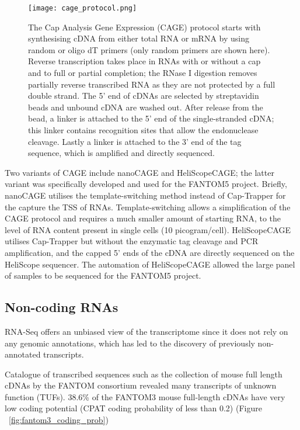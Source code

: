 \begin{figure}[!ht]
   \centering
   \texttt{[image: cage\_protocol.png]}
   \caption[Cap Analysis Gene Expression protocol]{The Cap Analysis Gene Expression (CAGE) protocol starts with synthesising cDNA from either total RNA or mRNA by using random or oligo dT primers (only random primers are shown here). Reverse transcription takes place in RNAs with or without a cap and to full or partial completion; the RNase I digestion removes partially reverse transcribed RNA as they are not protected by a full double strand. The 5' end of cDNAs are selected by streptavidin beads and unbound cDNA are washed out. After release from the bead, a linker is attached to the 5' end of the single-stranded cDNA; this linker contains recognition sites that allow the endonuclease cleavage. Lastly a linker is attached to the 3' end of the tag sequence, which is amplified and directly sequenced.}
   \label{fig:cage_protocol}
\end{figure}

Two variants of CAGE include nanoCAGE\cite{pmid20543846} and HeliScopeCAGE\cite{pmid21596820}; the latter variant was specifically developed and used for the FANTOM5 project. Briefly, nanoCAGE utilises the template-switching method\cite{pmid11314272} instead of Cap-Trapper for the capture the TSS of RNAs. Template-switching allows a simplification of the CAGE protocol and requires a much smaller amount of starting RNA, to the level of RNA content present in single cells (10 picogram/cell). HeliScopeCAGE utilises Cap-Trapper but without the enzymatic tag cleavage and PCR amplification, and the capped 5' ends of the cDNA are directly sequenced on the HeliScope sequencer. The automation of HeliScopeCAGE\cite{pmid22303458} allowed the large panel of samples to be sequenced for the FANTOM5 project.

\subsection{Non-coding RNAs}

RNA-Seq offers an unbiased view of the transcriptome since it does not rely on any genomic annotations, which has led to the discovery of previously non-annotated transcripts.

Catalogue of transcribed sequences such as the collection of mouse full length cDNAs by the FANTOM consortium revealed many transcripts of unknown function (TUFs)\cite{pmid16141072}. 38.6\% of the FANTOM3 mouse full-length cDNAs have very low coding potential (CPAT coding probability of less than 0.2) (Figure ~\ref{fig:fantom3_coding_prob})


